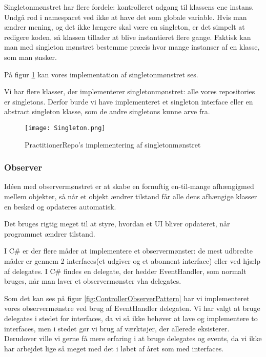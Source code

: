 Singletonmønstret har flere fordele: kontrolleret adgang til klassens ene instans.
Undgå rod i namespacet ved ikke at have det som globale variable.
Hvis man ændrer mening, og det ikke længere skal være en singleton, er det simpelt at redigere koden, så klassen tillader at blive instantieret flere gange. Faktisk kan man med singleton mønstret bestemme præcis hvor mange instanser af en klasse, som man ønsker.

På figur \ref{code:singleton} kan vores implementation af singletonmønstret ses.

Vi har flere klasser, der implementerer singletonmønstret: alle vores repositories er singletons.
Derfor burde vi have implementeret et singleton interface eller en abstract singleton klasse, som de andre singletons kunne arve fra.

\begin{figure}[h]
    \caption{PractitionerRepo's implementering af singletonmønstret}
    \centering
        \texttt{[image: Singleton.png]}
    \label{code:singleton}
\end{figure}

\subsubsection{Observer}
\label{observer}

Idéen med observermønstret er at skabe en fornuftig en-til-mange afhængigmed mellem objekter, så når et objekt ændrer tilstand får alle dens afhængige klasser en besked og opdateres automatisk.\cite{gangoffour}

Det bruges rigtig meget til at styre, hvordan et UI bliver opdateret, når programmet ændrer tilstand.

I C\# er der flere måder at implementere et observermønster: de mest udbredte måder er gennem 2 interfaces(et udgiver og et abonnent interface) eller ved hjælp af delegates.
I C\# findes en delegate, der hedder EventHandler, som normalt bruges, når man laver et observermønster vha delegates.

Som det kan ses på figur \ref{fig:ControllerObserverPattern} har vi implementeret vores observermønstre ved brug af EventHandler delegaten.
Vi har valgt at bruge delegates i stedet for interfaces, da vi så ikke behøver at lave og implementere to interfaces, men i stedet gør vi brug af værktøjer, der allerede eksisterer.
Derudover ville vi gerne få mere erfaring i at bruge delegates og events, da vi ikke har arbejdet lige så meget med det i løbet af året som med interfaces.

